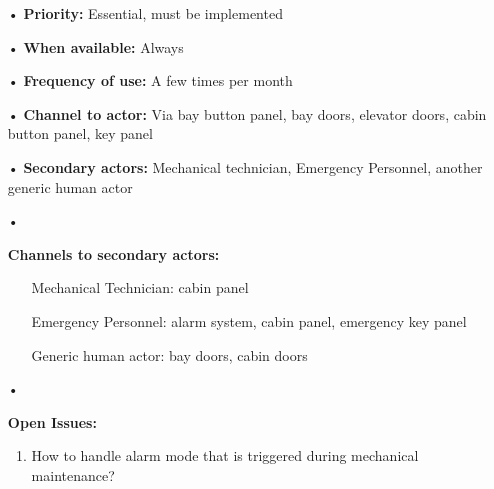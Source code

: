 \documentclass[12pt]{article}
\begin{document}
\begin{itemize}
{\begin{enumerate}
		        \end{enumerate}}
			\item[•] \textbf{Priority:} Essential, must be implemented
			\item[•] \textbf{When available:} Always
			\item[•] \textbf{Frequency of use:} A few times per month
			\item[•] \textbf{Channel to actor:} Via bay button panel, bay doors, elevator doors, cabin button panel, key panel
			\item[•] \textbf{Secondary actors:} Mechanical technician, Emergency Personnel, another 
			generic human actor		
			\item[•]{\textbf{Channels to secondary actors:}
			    \begin{itemize}
					\item[] Mechanical Technician: cabin panel
					\item[] Emergency Personnel: alarm system, cabin panel, emergency key panel
					\item[] Generic human actor: bay doors, cabin doors
			    \end{itemize}}
			\item[•]{\textbf{Open Issues:}
				\begin{enumerate}
					\item How to handle alarm mode that is triggered during mechanical maintenance?
				\end{enumerate}} 
		\end{itemize}
	
\end{document}
